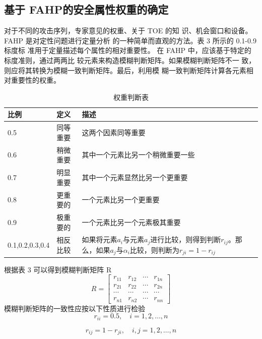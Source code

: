 \subsection{ 基于 FAHP的安全属性权重的确定}
对于不同的攻击序列，专家意见的权重、关于 TOE 的知
识、机会窗口和设备。FAHP\cite{liu2020review} \cite{kubler2016state} 是对定性问题进行定量分析
的一种简单而直观的方法。表 3 所示的 0.1-0.9 标度标
准用于定量描述每个属性的相对重要性。
在 FAHP 中，应该基于特定的标度准则，通过两两比
较元素来构造模糊判断矩阵。如果模糊判断矩阵不一
致，则应将其转换为模糊一致判断矩阵。最后，利用模
糊一致判断矩阵计算各元素相对重要性的权重。
\begin{table}
  \caption{权重判断表}
\begin{center}
    \begin{tabular}{|p{}<{\raggedright}|p{}<{\raggedright}|p{}<{\raggedright}|}
     \hline
      比例 & 定义 & 描述 \\\hline
      0.5 & 同等重要 & 这两个因素同等重要 \\\hline
      0.6 & 稍微重要 & 其中一个元素比另一个稍微重要一些 \\\hline
      0.7 & 明显重要 & 其中一个元素显然比另一个更重要 \\\hline
      0.8 & 更重要的 & 一个元素比另一个更重要 \\\hline
      0.9 & 极重要的 & 一个元素比另一个元素极其重要 \\\hline
      0.1,0.2,0.3,0.4 & 相反比较 & 如果将元素$a_i$与元素$a_j$进行比较，则得到判断$r_{i j}$。那么，如果$a_j$与$\alpha_i$比较，则判断为$r_{j i}=1-r_{i j}$ \\\hline  
    \end{tabular}
  \end{center}
\end{table}
根据表 3 可以得到模糊判断矩阵 R
$$
R=\left[\begin{array}{cccc}
r_{11} & r_{12} & \cdots & r_{1 n} \\
r_{21} & r_{22} & \cdots & r_{2 n} \\
\cdots & \cdots & \cdots & \cdots \\
r_{n 1} & r_{n 2} & \cdots & r_{n n}
\end{array}\right]
$$
模糊判断矩阵的一致性应按以下性质进行检验
\begin{equation}
    r_{i i}=0.5, \quad i=1,2, \ldots, n
    \end{equation}
    
    \begin{equation}
    r_{i j}=1-r_{j i}, \quad i, j=1,2, \ldots, n
    \end{equation}
    
